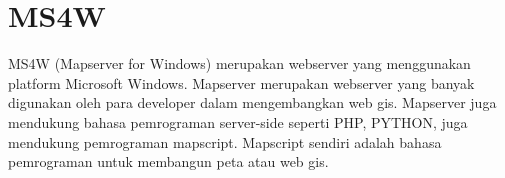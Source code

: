 \section{MS4W}
MS4W (Mapserver for Windows)  merupakan webserver yang menggunakan platform Microsoft Windows. Mapserver merupakan webserver yang banyak digunakan oleh para developer dalam mengembangkan web gis. Mapserver juga mendukung bahasa pemrograman server-side seperti PHP, PYTHON, juga mendukung pemrograman mapscript. Mapscript sendiri adalah bahasa pemrograman untuk membangun peta atau web gis. 

